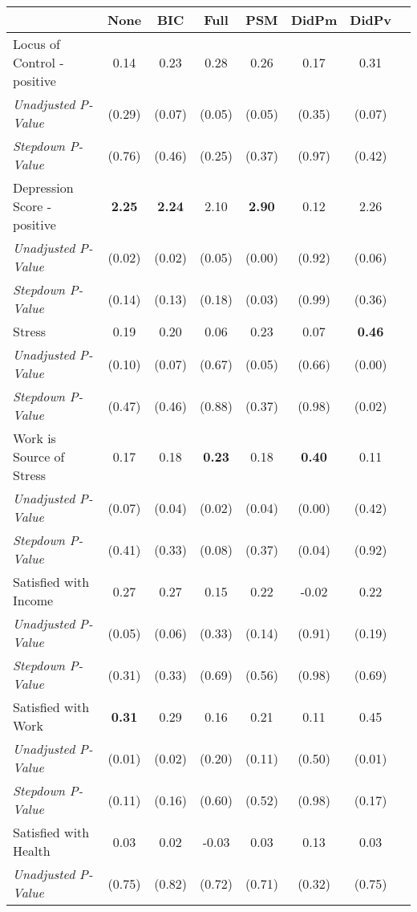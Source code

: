 \begin{tabular}{l c c c c c c c}
\toprule
 & None & BIC & Full & PSM & DidPm & DidPv \\
\midrule
Locus of Control - positive & 0.14 & 0.23 & 0.28 & 0.26 & 0.17 & 0.31 \\
\quad \textit{Unadjusted P-Value} & (0.29) & (0.07) & (0.05) & (0.05) & (0.35) & (0.07) \\
\quad \textit{Stepdown P-Value} & (0.76) & (0.46) & (0.25) & (0.37) & (0.97) & (0.42) \\
Depression Score - positive & \textbf{ 2.25 } & \textbf{ 2.24 } & 2.10 & \textbf{ 2.90 } & 0.12 & 2.26 \\
\quad \textit{Unadjusted P-Value} & (0.02) & (0.02) & (0.05) & (0.00) & (0.92) & (0.06) \\
\quad \textit{Stepdown P-Value} & (0.14) & (0.13) & (0.18) & (0.03) & (0.99) & (0.36) \\
Stress & 0.19 & 0.20 & 0.06 & 0.23 & 0.07 & \textbf{ 0.46 } \\
\quad \textit{Unadjusted P-Value} & (0.10) & (0.07) & (0.67) & (0.05) & (0.66) & (0.00) \\
\quad \textit{Stepdown P-Value} & (0.47) & (0.46) & (0.88) & (0.37) & (0.98) & (0.02) \\
Work is Source of Stress & 0.17 & 0.18 & \textbf{ 0.23 } & 0.18 & \textbf{ 0.40 } & 0.11 \\
\quad \textit{Unadjusted P-Value} & (0.07) & (0.04) & (0.02) & (0.04) & (0.00) & (0.42) \\
\quad \textit{Stepdown P-Value} & (0.41) & (0.33) & (0.08) & (0.37) & (0.04) & (0.92) \\
Satisfied with Income & 0.27 & 0.27 & 0.15 & 0.22 & -0.02 & 0.22 \\
\quad \textit{Unadjusted P-Value} & (0.05) & (0.06) & (0.33) & (0.14) & (0.91) & (0.19) \\
\quad \textit{Stepdown P-Value} & (0.31) & (0.33) & (0.69) & (0.56) & (0.98) & (0.69) \\
Satisfied with Work & \textbf{ 0.31 } & 0.29 & 0.16 & 0.21 & 0.11 & 0.45 \\
\quad \textit{Unadjusted P-Value} & (0.01) & (0.02) & (0.20) & (0.11) & (0.50) & (0.01) \\
\quad \textit{Stepdown P-Value} & (0.11) & (0.16) & (0.60) & (0.52) & (0.98) & (0.17) \\
Satisfied with Health & 0.03 & 0.02 & -0.03 & 0.03 & 0.13 & 0.03 \\
\quad \textit{Unadjusted P-Value} & (0.75) & (0.82) & (0.72) & (0.71) & (0.32) & (0.75) \\

\end{tabular}
